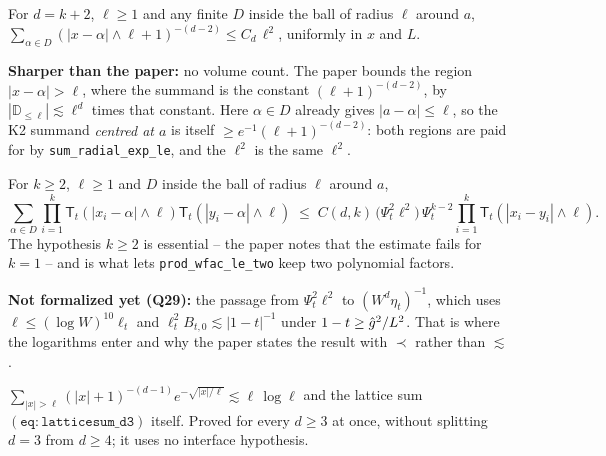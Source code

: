 \begin{lemma}\label{lem:ballsum}
  \leanok
  For $d=k+2$, $\ell\ge1$ and any finite $D$ inside the ball of radius $\ell$ around $a$,
  $\sum_{\alpha\in D}(|x-\alpha|\wedge\ell+1)^{-(d-2)}\le C_d\,\ell^2$, uniformly in $x$ and $L$.

  \textbf{Sharper than the paper:} no volume count.  The paper bounds the region
  $|x-\alpha|>\ell$, where the summand is the constant $(\ell+1)^{-(d-2)}$, by
  $|\mathbb D_{\le\ell}|\lesssim\ell^d$ times that constant.  Here $\alpha\in D$ already gives
  $|a-\alpha|\le\ell$, so the K2 summand \emph{centred at $a$} is itself
  $\ge e^{-1}(\ell+1)^{-(d-2)}$: both regions are paid for by \texttt{sum\_radial\_exp\_le},
  and the $\ell^2$ is the same $\ell^2$.
\end{lemma}

\begin{lemma}\label{lem:TTk-sum}
  \leanok
  For $k\ge2$, $\ell\ge1$ and $D$ inside the ball of radius $\ell$ around $a$,
  \[\sum_{\alpha\in D}\prod_{i=1}^k\mathsf T_t(|x_i-\alpha|\wedge\ell)\mathsf T_t(|y_i-\alpha|\wedge\ell)
    \;\le\;C(d,k)\,\bigl(\Psi_t^2\ell^2\bigr)\,\Psi_t^{k-2}\prod_{i=1}^k\mathsf T_t(|x_i-y_i|\wedge\ell).\]
  The hypothesis $k\ge2$ is essential -- the paper notes that the estimate fails for $k=1$ --
  and is what lets \texttt{prod\_wfac\_le\_two} keep two polynomial factors.

  \textbf{Not formalized yet (Q29):} the passage from $\Psi_t^2\ell^2$ to $(W^d\eta_t)^{-1}$,
  which uses $\ell\le(\log W)^{10}\ell_t$ and $\ell_t^2B_{t,0}\lesssim|1-t|^{-1}$ under
  $1-t\ge\hat{g}^2/L^2$.  That is where the logarithms enter and why the paper states
  the result with $\prec$ rather than $\lesssim$.
\end{lemma}


\begin{lemma}\label{lem:latticesum}
  \leanok
  $\sum_{|x|>\ell}(|x|+1)^{-(d-1)}e^{-\sqrt{|x|/\ell}}\lesssim \ell\,\log\ell$ and the
  lattice sum $\mathtt{(eq{:}latticesum\_d3)}$ itself.  Proved for every $d\ge3$ at once,
  without splitting $d=3$ from $d\ge4$; it uses no interface hypothesis.
\end{lemma}

